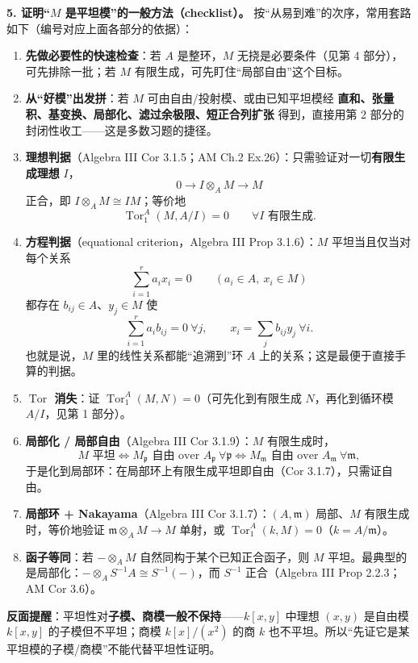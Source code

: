\documentclass[a4paper]{ctexart}
\theoremstyle{definition}
\theoremstyle{analysis}
\theoremstyle{plain}
\begin{document}
\textbf{5. 证明``\(M\) 是平坦模''的一般方法（checklist）。}
按``从易到难''的次序，常用套路如下（编号对应上面各部分的依据）：
\begin{enumerate}
  \item \textbf{先做必要性的快速检查}：若 \(A\) 是整环，\(M\) 无挠是必要条件（见第 4 部分），可先排除一批；若 \(M\) 有限生成，可先盯住``局部自由''这个目标。
  \item \textbf{从``好模''出发拼}：若 \(M\) 可由自由/投射模、或由已知平坦模经 \textbf{直和、张量积、基变换、局部化、滤过余极限、短正合列扩张} 得到，直接用第 2 部分的封闭性收工——这是多数习题的捷径。
  \item \textbf{理想判据}（Algebra III Cor 3.1.5；AM Ch.2 Ex.26）：只需验证对一切\textbf{有限生成理想} \(I\)，
  \[
    0\to I\otimes_A M\to M
  \]
  正合，即 \(I\otimes_A M\cong IM\)；等价地
  \[
    \operatorname{Tor}_1^A(M,A/I)=0\qquad \forall I\text{ 有限生成}.
  \]
  \item \textbf{方程判据}（equational criterion，Algebra III Prop 3.1.6）：\(M\) 平坦当且仅当对每个关系
  \[
    \sum_{i=1}^r a_i x_i=0\qquad(a_i\in A,\ x_i\in M)
  \]
  都存在 \(b_{ij}\in A\)、\(y_j\in M\) 使
  \[
    \sum_{i=1}^r a_i b_{ij}=0\ \forall j,\qquad
    x_i=\sum_j b_{ij}y_j\ \forall i.
  \]
  也就是说，\(M\) 里的线性关系都能``追溯到''环 \(A\) 上的关系；这是最便于直接手算的判据。
  \item \textbf{\(\operatorname{Tor}\) 消失}：证 \(\operatorname{Tor}_1^A(M,N)=0\)（可先化到有限生成 \(N\)，再化到循环模 \(A/I\)，见第 1 部分）。
  \item \textbf{局部化 / 局部自由}（Algebra III Cor 3.1.9）：\(M\) 有限生成时，
  \[
    M\text{ 平坦}\iff M_{\mathfrak p}\text{ 自由 over }A_{\mathfrak p}\ \forall\mathfrak p
    \iff M_{\mathfrak m}\text{ 自由 over }A_{\mathfrak m}\ \forall\mathfrak m,
  \]
  于是化到局部环：在局部环上有限生成平坦即自由（Cor 3.1.7），只需证自由。
  \item \textbf{局部环 + Nakayama}（Algebra III Cor 3.1.7）：\((A,\mathfrak m)\) 局部、\(M\) 有限生成时，等价地验证 \(\mathfrak m\otimes_A M\to M\) 单射，或 \(\operatorname{Tor}_1^A(k,M)=0\)（\(k=A/\mathfrak m\)）。
  \item \textbf{函子等同}：若 \(-\otimes_A M\) 自然同构于某个已知正合函子，则 \(M\) 平坦。最典型的是局部化：\(-\otimes_A S^{-1}A\cong S^{-1}(-)\)，而 \(S^{-1}\) 正合（Algebra III Prop 2.2.3；AM Cor 3.6）。
\end{enumerate}
\textbf{反面提醒}：平坦性对\textbf{子模、商模一般不保持}——\(k[x,y]\) 中理想 \((x,y)\) 是自由模 \(k[x,y]\) 的子模但不平坦；商模 \(k[x]/(x^2)\) 的商 \(k\) 也不平坦。所以``先证它是某平坦模的子模/商模''不能代替平坦性证明。
\end{document}
